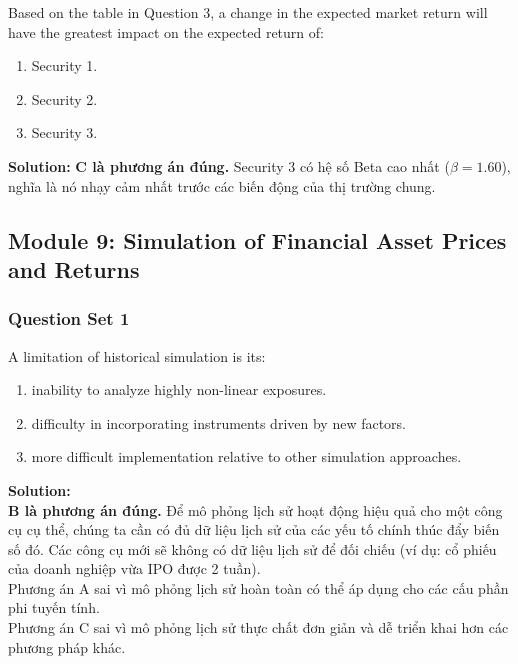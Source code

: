 \begin{tcolorbox}[
	colback=gray!5!white,
	colframe=black!15!white,
	boxrule=0.5pt,
	arc=3pt,
	title=\textbf{Question 5},
	coltitle=black,
	colbacktitle=black!5!white,
	before skip=6pt,
	after skip=6pt,
	breakable
]
Based on the table in Question 3, a change in the expected market return will have the greatest impact on the expected return of:
\begin{enumerate}[label=\Alph*.]
	\item Security 1.
	\item Security 2.
	\item Security 3.
\end{enumerate}

\textbf{Solution:}
\textbf{C là phương án đúng.} Security 3 có hệ số Beta cao nhất ($\beta = 1.60$), nghĩa là nó nhạy cảm nhất trước các biến động của thị trường chung.
\end{tcolorbox}

\newpage

\subsection*{Module 9: Simulation of Financial Asset Prices and Returns}

\subsubsection{Question Set 1}
\label{subsec:app_mod9_Question_Set_1}

\begin{tcolorbox}[
	colback=gray!5!white,
	colframe=black!15!white,
	boxrule=0.5pt,
	arc=3pt,
	title=\textbf{Question 1},
	coltitle=black,
	colbacktitle=black!5!white,
	before skip=6pt,
	after skip=6pt,
	breakable
]
A limitation of historical simulation is its:
\begin{enumerate}[label=\Alph*.]
	\item inability to analyze highly non-linear exposures.
	\item difficulty in incorporating instruments driven by new factors.
	\item more difficult implementation relative to other simulation approaches.
\end{enumerate}

\textbf{Solution:} \\
\textbf{B là phương án đúng.} Để mô phỏng lịch sử hoạt động hiệu quả cho một công cụ cụ thể, chúng ta cần có đủ dữ liệu lịch sử của các yếu tố chính thúc đẩy biến số đó. Các công cụ mới sẽ không có dữ liệu lịch sử để đối chiếu (ví dụ: cổ phiếu của doanh nghiệp vừa IPO được 2 tuần). \\
Phương án A sai vì mô phỏng lịch sử hoàn toàn có thể áp dụng cho các cấu phần phi tuyến tính. \\
Phương án C sai vì mô phỏng lịch sử thực chất đơn giản và dễ triển khai hơn các phương pháp khác.
\end{tcolorbox}

